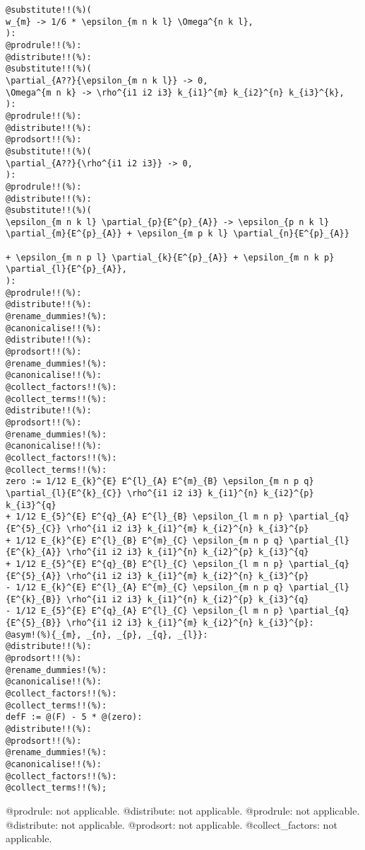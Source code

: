 \documentclass[11pt]{article}
\begin{document}
{\color[named]{Blue}\begin{verbatim}
@substitute!!(%)(
w_{m} -> 1/6 * \epsilon_{m n k l} \Omega^{n k l},
):
@prodrule!!(%):
@distribute!!(%):
@substitute!!(%)(
\partial_{A??}{\epsilon_{m n k l}} -> 0,
\Omega^{m n k} -> \rho^{i1 i2 i3} k_{i1}^{m} k_{i2}^{n} k_{i3}^{k},
):
@prodrule!!(%):
@distribute!!(%):
@prodsort!!(%):
@substitute!!(%)(
\partial_{A??}{\rho^{i1 i2 i3}} -> 0,
):
@prodrule!!(%):
@distribute!!(%):
@substitute!!(%)(
\epsilon_{m n k l} \partial_{p}{E^{p}_{A}} -> \epsilon_{p n k l} \partial_{m}{E^{p}_{A}} + \epsilon_{m p k l} \partial_{n}{E^{p}_{A}}
                                                                         + \epsilon_{m n p l} \partial_{k}{E^{p}_{A}} + \epsilon_{m n k p} \partial_{l}{E^{p}_{A}},
):
@prodrule!!(%):
@distribute!!(%):
@rename_dummies!(%):
@canonicalise!!(%):
@distribute!!(%):
@prodsort!!(%):
@rename_dummies!(%):
@canonicalise!!(%):
@collect_factors!!(%):
@collect_terms!!(%):
@distribute!!(%):
@prodsort!!(%):
@rename_dummies!(%):
@canonicalise!!(%):
@collect_factors!!(%):
@collect_terms!!(%):
zero := 1/12 E_{k}^{E} E^{l}_{A} E^{m}_{B} \epsilon_{m n p q} \partial_{l}{E^{k}_{C}} \rho^{i1 i2 i3} k_{i1}^{n} k_{i2}^{p} k_{i3}^{q} 
+ 1/12 E_{5}^{E} E^{q}_{A} E^{l}_{B} \epsilon_{l m n p} \partial_{q}{E^{5}_{C}} \rho^{i1 i2 i3} k_{i1}^{m} k_{i2}^{n} k_{i3}^{p} 
+ 1/12 E_{k}^{E} E^{l}_{B} E^{m}_{C} \epsilon_{m n p q} \partial_{l}{E^{k}_{A}} \rho^{i1 i2 i3} k_{i1}^{n} k_{i2}^{p} k_{i3}^{q} 
+ 1/12 E_{5}^{E} E^{q}_{B} E^{l}_{C} \epsilon_{l m n p} \partial_{q}{E^{5}_{A}} \rho^{i1 i2 i3} k_{i1}^{m} k_{i2}^{n} k_{i3}^{p} 
- 1/12 E_{k}^{E} E^{l}_{A} E^{m}_{C} \epsilon_{m n p q} \partial_{l}{E^{k}_{B}} \rho^{i1 i2 i3} k_{i1}^{n} k_{i2}^{p} k_{i3}^{q} 
- 1/12 E_{5}^{E} E^{q}_{A} E^{l}_{C} \epsilon_{l m n p} \partial_{q}{E^{5}_{B}} \rho^{i1 i2 i3} k_{i1}^{m} k_{i2}^{n} k_{i3}^{p}:
@asym!(%){_{m}, _{n}, _{p}, _{q}, _{l}}:
@distribute!!(%):
@prodsort!!(%):
@rename_dummies!(%):
@canonicalise!!(%):
@collect_factors!!(%):
@collect_terms!!(%):
defF := @(F) - 5 * @(zero):
@distribute!!(%):
@prodsort!!(%):
@rename_dummies!(%):
@canonicalise!!(%):
@collect_factors!!(%):
@collect_terms!!(%);
\end{verbatim}}
@prodrule: not applicable.
@distribute: not applicable.
@prodrule: not applicable.
@distribute: not applicable.
@prodsort: not applicable.
@collect\_factors: not applicable.
\end{document}
